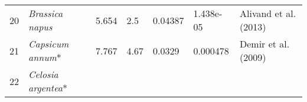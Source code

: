 \documentclass[]{article}
\begin{document}
\begin{longtable}[]{@{}lllllll@{}}
\begin{minipage}[t]{0.05\columnwidth}
20\strut
\end{minipage} & \begin{minipage}[t]{0.23\columnwidth}\raggedright
\emph{Brassica napus}\strut
\end{minipage} & \begin{minipage}[t]{0.05\columnwidth}\raggedright
5.654\strut
\end{minipage} & \begin{minipage}[t]{0.08\columnwidth}\raggedright
2.5\strut
\end{minipage} & \begin{minipage}[t]{0.08\columnwidth}\raggedright
0.04387\strut
\end{minipage} & \begin{minipage}[t]{0.08\columnwidth}\raggedright
1.438e-05\strut
\end{minipage} & \begin{minipage}[t]{0.23\columnwidth}\raggedright
Alivand et al. (2013)\strut
\end{minipage}\tabularnewline
\begin{minipage}[t]{0.05\columnwidth}\raggedright
21\strut
\end{minipage} & \begin{minipage}[t]{0.23\columnwidth}\raggedright
\emph{Capsicum annum}*\strut
\end{minipage} & \begin{minipage}[t]{0.05\columnwidth}\raggedright
7.767\strut
\end{minipage} & \begin{minipage}[t]{0.08\columnwidth}\raggedright
4.67\strut
\end{minipage} & \begin{minipage}[t]{0.08\columnwidth}\raggedright
0.0329\strut
\end{minipage} & \begin{minipage}[t]{0.08\columnwidth}\raggedright
0.000478\strut
\end{minipage} & \begin{minipage}[t]{0.23\columnwidth}\raggedright
Demir et al. (2009)\strut
\end{minipage}\tabularnewline
\begin{minipage}[t]{0.05\columnwidth}\raggedright
22\strut
\end{minipage} & \begin{minipage}[t]{0.23\columnwidth}\raggedright
\emph{Celosia argentea}*\strut
\end{minipage} & \begin{minipage}[t]{0.05\columnwidth}\raggedright

\end{minipage}
\end{longtable}
\end{document}
